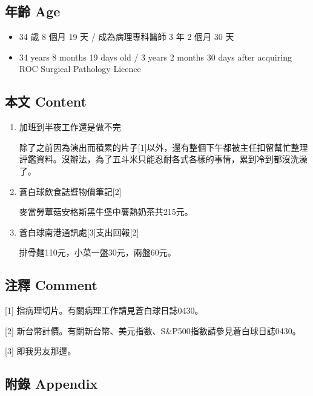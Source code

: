 \documentclass[a5paper, 11pt
]{book}
\providecommand{\tightlist}{%
  \setlength{\itemsep}{0pt}\setlength{\parskip}{0pt}}
\begin{document}
\hypertarget{ux5e74ux9f61-age-41}{%
\subsection{年齡 Age}\label{ux5e74ux9f61-age-41}}

\begin{itemize}
\tightlist
\item
  34 歲 8 個月 19 天 / 成為病理專科醫師 3 年 2 個月 30 天
\item
  34 years 8 months 19 days old / 3 years 2 months 30 days after
  acquiring ROC Surgical Pathology Licence
\end{itemize}

\hypertarget{ux672cux6587-content-41}{%
\subsection{本文 Content}\label{ux672cux6587-content-41}}

\begin{enumerate}
\def\labelenumi{\arabic{enumi}.}
\item
  加班到半夜工作還是做不完

  除了之前因為演出而積累的片子{[}1{]}以外，還有整個下午都被主任扣留幫忙整理評鑑資料。沒辦法，為了五斗米只能忍耐各式各樣的事情，累到冷到都沒洗澡了。
\item
  蒼白球飲食誌暨物價筆記{[}2{]}

  麥當勞蕈菇安格斯黑牛堡中薯熱奶茶共215元。
\item
  蒼白球南港通訊處{[}3{]}支出回報{[}2{]}

  排骨麵110元，小菜一盤30元，兩盤60元。
\end{enumerate}

\hypertarget{ux6ce8ux91cb-comment-41}{%
\subsection{注釋 Comment}\label{ux6ce8ux91cb-comment-41}}

{[}1{]} 指病理切片。有關病理工作請見蒼白球日誌0430。

{[}2{]}
新台幣計價。有關新台幣、美元指數、S\&P500指數請參見蒼白球日誌0430。

{[}3{]} 即我男友那邊。

\hypertarget{ux9644ux9304-appendix-41}{%
\subsection{附錄 Appendix}\label{ux9644ux9304-appendix-41}}
\end{document}
